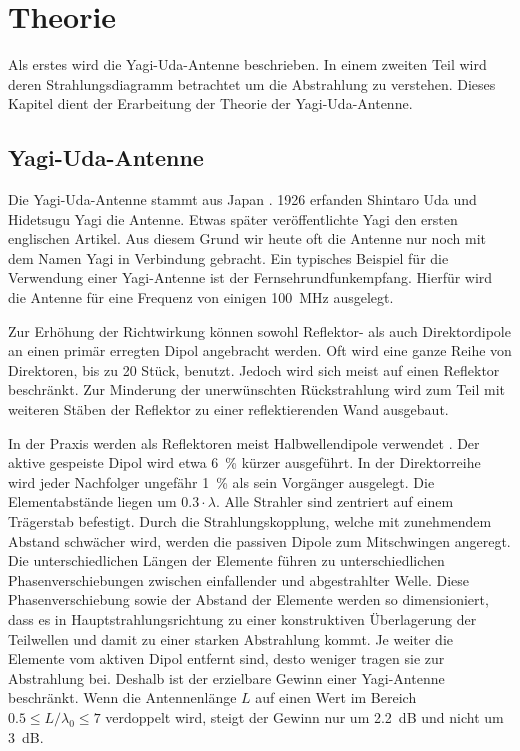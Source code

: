\section{Theorie}
Als erstes wird die Yagi-Uda-Antenne beschrieben. In einem zweiten Teil wird deren Strahlungsdiagramm betrachtet um die Abstrahlung zu verstehen. Dieses Kapitel dient der Erarbeitung der Theorie der Yagi-Uda-Antenne.

\subsection{Yagi-Uda-Antenne}\label{sec:Yagi}
Die Yagi-Uda-Antenne stammt aus Japan \cite{script}. 1926 erfanden Shintaro Uda und Hidetsugu Yagi die Antenne. Etwas später veröffentlichte Yagi den ersten englischen Artikel. Aus diesem Grund wir heute oft die Antenne nur noch mit dem Namen Yagi in Verbindung gebracht. Ein typisches Beispiel für die Verwendung einer Yagi-Antenne ist der Fernsehrundfunkempfang. Hierfür wird die Antenne für eine Frequenz von einigen \SI{100}{MHz} ausgelegt.

Zur Erhöhung der Richtwirkung können sowohl Reflektor- als auch Direktordipole an einen primär erregten Dipol angebracht werden. Oft wird eine ganze Reihe von Direktoren, bis zu 20 Stück, benutzt. Jedoch wird sich meist auf einen Reflektor beschränkt. Zur Minderung der unerwünschten Rückstrahlung wird zum Teil mit weiteren Stäben der Reflektor zu einer reflektierenden Wand ausgebaut.

In der Praxis werden als Reflektoren meist Halbwellendipole verwendet \cite{book}. Der aktive gespeiste Dipol wird etwa \SI{6}{\percent} kürzer ausgeführt. In der Direktorreihe wird jeder Nachfolger ungefähr \SI{1}{\percent} als sein Vorgänger ausgelegt. Die Elementabstände liegen um $0.3 \cdot \lambda $. Alle Strahler sind zentriert auf einem Trägerstab befestigt. Durch die Strahlungskopplung, welche mit zunehmendem Abstand schwächer wird, werden die passiven Dipole zum Mitschwingen angeregt. Die unterschiedlichen Längen der Elemente führen zu unterschiedlichen Phasenverschiebungen zwischen einfallender und abgestrahlter Welle. Diese Phasenverschiebung sowie der Abstand der Elemente werden so dimensioniert, dass es in Hauptstrahlungsrichtung zu einer konstruktiven Überlagerung der Teilwellen und damit zu einer starken Abstrahlung kommt. Je weiter die Elemente vom aktiven Dipol entfernt sind, desto weniger tragen sie zur Abstrahlung bei. Deshalb ist der erzielbare Gewinn einer Yagi-Antenne beschränkt. Wenn die Antennenlänge $L$ auf einen Wert im Bereich $ 0.5\leq L/\lambda_{0} \leq 7$ verdoppelt wird, steigt der Gewinn nur um \SI{2.2}{dB} und nicht um \SI{3}{dB}.

